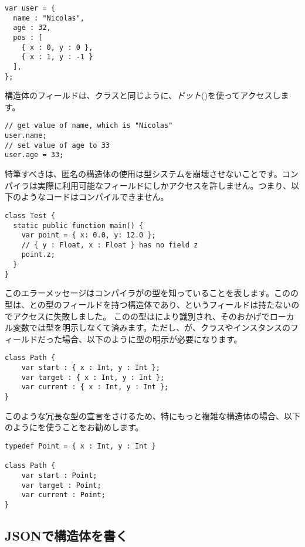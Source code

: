 \begin{lstlisting}
var user = {
  name : "Nicolas",
  age : 32,
  pos : [
    { x : 0, y : 0 },
    { x : 1, y : -1 }
  ],
};
\end{lstlisting}
構造体のフィールドは、クラスと同じように、\emph{ドット}()を使ってアクセスします。

\begin{lstlisting}
// get value of name, which is "Nicolas"
user.name;
// set value of age to 33
user.age = 33;
\end{lstlisting}
特筆すべきは、匿名の構造体の使用は型システムを崩壊させないことです。コンパイラは実際に利用可能なフィールドにしかアクセスを許しません。つまり、以下のようなコードはコンパイルできません。

\begin{lstlisting}
class Test {
  static public function main() {
    var point = { x: 0.0, y: 12.0 };
    // { y : Float, x : Float } has no field z
    point.z;
  }
}
\end{lstlisting}
このエラーメッセージはコンパイラがの型を知っていることを表します。このの型は、との型のフィールドを持つ構造体であり、というフィールドは持たないのでアクセスに失敗しました。
このの型はにより識別され、そのおかげでローカル変数では型を明示しなくて済みます。ただし、が、クラスやインスタンスのフィールドだった場合、以下のように型の明示が必要になります。

\begin{lstlisting}
class Path {
    var start : { x : Int, y : Int };
    var target : { x : Int, y : Int };
    var current : { x : Int, y : Int };
}
\end{lstlisting}

このような冗長な型の宣言をさけるため、特にもっと複雑な構造体の場合、以下のようにを使うことをお勧めします。

\begin{lstlisting}
typedef Point = { x : Int, y : Int }

class Path {
    var start : Point;
    var target : Point;
    var current : Point;
}
\end{lstlisting}


\subsection{JSONで構造体を書く}
\label{types-structure-json}

